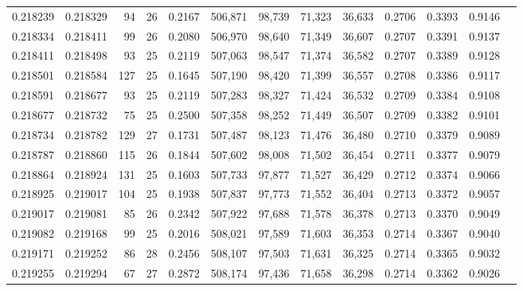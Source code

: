 \begin{tabular}{rrrrrrrrrrrrr}
0.218239 & 0.218329 &  94 &  26 &                                     0.2167 & 506,871 &  98,739 &  71,323 &  36,633 & 0.2706 & 0.3393 & 0.9146 \\
0.218334 & 0.218411 &  99 &  26 &                                     0.2080 & 506,970 &  98,640 &  71,349 &  36,607 & 0.2707 & 0.3391 & 0.9137 \\
0.218411 & 0.218498 &  93 &  25 &                                     0.2119 & 507,063 &  98,547 &  71,374 &  36,582 & 0.2707 & 0.3389 & 0.9128 \\
0.218501 & 0.218584 & 127 &  25 &                                     0.1645 & 507,190 &  98,420 &  71,399 &  36,557 & 0.2708 & 0.3386 & 0.9117 \\
0.218591 & 0.218677 &  93 &  25 &                                     0.2119 & 507,283 &  98,327 &  71,424 &  36,532 & 0.2709 & 0.3384 & 0.9108 \\
0.218677 & 0.218732 &  75 &  25 &                                     0.2500 & 507,358 &  98,252 &  71,449 &  36,507 & 0.2709 & 0.3382 & 0.9101 \\
0.218734 & 0.218782 & 129 &  27 &                                     0.1731 & 507,487 &  98,123 &  71,476 &  36,480 & 0.2710 & 0.3379 & 0.9089 \\
0.218787 & 0.218860 & 115 &  26 &                                     0.1844 & 507,602 &  98,008 &  71,502 &  36,454 & 0.2711 & 0.3377 & 0.9079 \\
0.218864 & 0.218924 & 131 &  25 &                                     0.1603 & 507,733 &  97,877 &  71,527 &  36,429 & 0.2712 & 0.3374 & 0.9066 \\
0.218925 & 0.219017 & 104 &  25 &                                     0.1938 & 507,837 &  97,773 &  71,552 &  36,404 & 0.2713 & 0.3372 & 0.9057 \\
0.219017 & 0.219081 &  85 &  26 &                                     0.2342 & 507,922 &  97,688 &  71,578 &  36,378 & 0.2713 & 0.3370 & 0.9049 \\
0.219082 & 0.219168 &  99 &  25 &                                     0.2016 & 508,021 &  97,589 &  71,603 &  36,353 & 0.2714 & 0.3367 & 0.9040 \\
0.219171 & 0.219252 &  86 &  28 &                                     0.2456 & 508,107 &  97,503 &  71,631 &  36,325 & 0.2714 & 0.3365 & 0.9032 \\
0.219255 & 0.219294 &  67 &  27 &                                     0.2872 & 508,174 &  97,436 &  71,658 &  36,298 & 0.2714 & 0.3362 & 0.9026 \\

\end{tabular}
